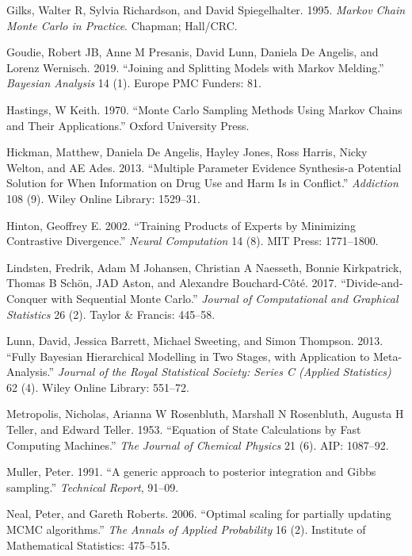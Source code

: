 \documentclass[11pt,]{book}
\begin{document}
\hypertarget{ref-gilks1995markov}{}
Gilks, Walter R, Sylvia Richardson, and David Spiegelhalter. 1995.
\emph{Markov Chain Monte Carlo in Practice}. Chapman; Hall/CRC.

\hypertarget{ref-goudie2019joining}{}
Goudie, Robert JB, Anne M Presanis, David Lunn, Daniela De Angelis, and
Lorenz Wernisch. 2019. ``Joining and Splitting Models with Markov
Melding.'' \emph{Bayesian Analysis} 14 (1). Europe PMC Funders: 81.

\hypertarget{ref-hastings1970monte}{}
Hastings, W Keith. 1970. ``Monte Carlo Sampling Methods Using Markov
Chains and Their Applications.'' Oxford University Press.

\hypertarget{ref-hickman2013multiple}{}
Hickman, Matthew, Daniela De Angelis, Hayley Jones, Ross Harris, Nicky
Welton, and AE Ades. 2013. ``Multiple Parameter Evidence Synthesis-a
Potential Solution for When Information on Drug Use and Harm Is in
Conflict.'' \emph{Addiction} 108 (9). Wiley Online Library: 1529--31.

\hypertarget{ref-hinton2002training}{}
Hinton, Geoffrey E. 2002. ``Training Products of Experts by Minimizing
Contrastive Divergence.'' \emph{Neural Computation} 14 (8). MIT Press:
1771--1800.

\hypertarget{ref-lindsten2017divide}{}
Lindsten, Fredrik, Adam M Johansen, Christian A Naesseth, Bonnie
Kirkpatrick, Thomas B Schön, JAD Aston, and Alexandre Bouchard-Côté.
2017. ``Divide-and-Conquer with Sequential Monte Carlo.'' \emph{Journal
of Computational and Graphical Statistics} 26 (2). Taylor \& Francis:
445--58.

\hypertarget{ref-lunn2013fully}{}
Lunn, David, Jessica Barrett, Michael Sweeting, and Simon Thompson.
2013. ``Fully Bayesian Hierarchical Modelling in Two Stages, with
Application to Meta-Analysis.'' \emph{Journal of the Royal Statistical
Society: Series C (Applied Statistics)} 62 (4). Wiley Online Library:
551--72.

\hypertarget{ref-metropolis1953equation}{}
Metropolis, Nicholas, Arianna W Rosenbluth, Marshall N Rosenbluth,
Augusta H Teller, and Edward Teller. 1953. ``Equation of State
Calculations by Fast Computing Machines.'' \emph{The Journal of Chemical
Physics} 21 (6). AIP: 1087--92.

\hypertarget{ref-muller1991generic}{}
Muller, Peter. 1991. ``A generic approach to posterior integration and
Gibbs sampling.'' \emph{Technical Report}, 91--09.

\hypertarget{ref-neal2006optimal}{}
Neal, Peter, and Gareth Roberts. 2006. ``Optimal scaling for partially
updating MCMC algorithms.'' \emph{The Annals of Applied Probability} 16
(2). Institute of Mathematical Statistics: 475--515.
\end{document}
